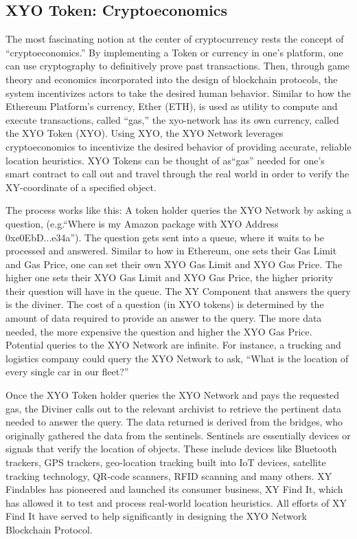 \documentclass{article}
\begin{document}
\subsection {XYO Token: Cryptoeconomics}
The most fascinating notion at the center of cryptocurrency rests the concept of ``\gls{cryptoeconomics}.'' By implementing a Token or currency in one's platform, one can use cryptography to definitively prove past transactions. Then, through game theory and economics incorporated into the design of blockchain protocols, the system incentivizes actors to take the desired human behavior. Similar to how the Ethereum Platform's currency, Ether (ETH), is used as utility to compute and execute transactions, called ``\gls{gas},'' the \Gls{xyo-network} has its own currency, called the XYO Token (XYO). Using XYO, the XYO Network leverages cryptoeconomics to incentivize the desired behavior of providing accurate, reliable location \glspl{heuristic}. XYO Tokens can be thought of as``gas'' needed for one's smart contract to call out and travel through the real world in order to verify the XY-coordinate of a specified object.

The process works like this: A token holder queries the XYO Network by asking a question, (e.g.``Where is my Amazon package with XYO Address 0xe0EbD...e34a''). The question gets sent into a queue, where it waits to be processed and answered. Similar to how in Ethereum, one sets their Gas Limit and Gas Price, one can set their own XYO Gas Limit and XYO Gas Price. The higher one sets their XYO Gas Limit and XYO Gas Price, the higher priority their question will have in the queue. The XY Component that answers the query is the \Gls{diviner}. The cost of a question (in XYO tokens) is determined by the amount of data required to provide an answer to the query.  The more data needed, the more expensive the question and higher the XYO Gas Price. Potential queries to the XYO Network are infinite. For instance, a trucking and logistics company could query the XYO Network to ask, ``What is the location of every single car in our fleet?''

Once the XYO Token holder queries the XYO Network and pays the requested gas, the Diviner calls out to the relevant \Gls{archivist} to retrieve the pertinent data needed to answer the query. The data returned is derived from the \Glspl{bridge}, who originally gathered the data from the \Glspl{sentinel}. Sentinels are essentially devices or signals that verify the location of objects. These include devices like Bluetooth trackers, GPS trackers, geo-location tracking built into IoT devices, satellite tracking technology, QR-code scanners, RFID scanning and many others. XY Findables has pioneered and launched its consumer business, XY Find It, which has allowed it to test and process real-world location heuristics. All efforts of XY Find It have served to help significantly in designing the XYO Network Blockchain Protocol.
\end{document}
